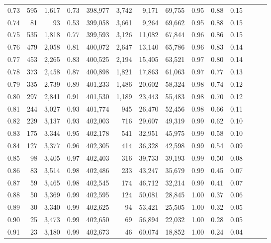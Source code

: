\begin{tabular}{rrrrrrrrrrrrrr}
0.73 &    595 &  1,617 &  0.73 &  398,977 &    3,742 &   9,171 &  69,755 &  0.95 &  0.88 &      0.15 \\
0.74 &     81 &     93 &  0.53 &  399,058 &    3,661 &   9,264 &  69,662 &  0.95 &  0.88 &      0.15 \\
0.75 &    535 &  1,818 &  0.77 &  399,593 &    3,126 &  11,082 &  67,844 &  0.96 &  0.86 &      0.15 \\
0.76 &    479 &  2,058 &  0.81 &  400,072 &    2,647 &  13,140 &  65,786 &  0.96 &  0.83 &      0.14 \\
0.77 &    453 &  2,265 &  0.83 &  400,525 &    2,194 &  15,405 &  63,521 &  0.97 &  0.80 &      0.14 \\
0.78 &    373 &  2,458 &  0.87 &  400,898 &    1,821 &  17,863 &  61,063 &  0.97 &  0.77 &      0.13 \\
0.79 &    335 &  2,739 &  0.89 &  401,233 &    1,486 &  20,602 &  58,324 &  0.98 &  0.74 &      0.12 \\
0.80 &    297 &  2,841 &  0.91 &  401,530 &    1,189 &  23,443 &  55,483 &  0.98 &  0.70 &      0.12 \\
0.81 &    244 &  3,027 &  0.93 &  401,774 &      945 &  26,470 &  52,456 &  0.98 &  0.66 &      0.11 \\
0.82 &    229 &  3,137 &  0.93 &  402,003 &      716 &  29,607 &  49,319 &  0.99 &  0.62 &      0.10 \\
0.83 &    175 &  3,344 &  0.95 &  402,178 &      541 &  32,951 &  45,975 &  0.99 &  0.58 &      0.10 \\
0.84 &    127 &  3,377 &  0.96 &  402,305 &      414 &  36,328 &  42,598 &  0.99 &  0.54 &      0.09 \\
0.85 &     98 &  3,405 &  0.97 &  402,403 &      316 &  39,733 &  39,193 &  0.99 &  0.50 &      0.08 \\
0.86 &     83 &  3,514 &  0.98 &  402,486 &      233 &  43,247 &  35,679 &  0.99 &  0.45 &      0.07 \\
0.87 &     59 &  3,465 &  0.98 &  402,545 &      174 &  46,712 &  32,214 &  0.99 &  0.41 &      0.07 \\
0.88 &     50 &  3,369 &  0.99 &  402,595 &      124 &  50,081 &  28,845 &  1.00 &  0.37 &      0.06 \\
0.89 &     30 &  3,340 &  0.99 &  402,625 &       94 &  53,421 &  25,505 &  1.00 &  0.32 &      0.05 \\
0.90 &     25 &  3,473 &  0.99 &  402,650 &       69 &  56,894 &  22,032 &  1.00 &  0.28 &      0.05 \\
0.91 &     23 &  3,180 &  0.99 &  402,673 &       46 &  60,074 &  18,852 &  1.00 &  0.24 &      0.04 \\

\end{tabular}

